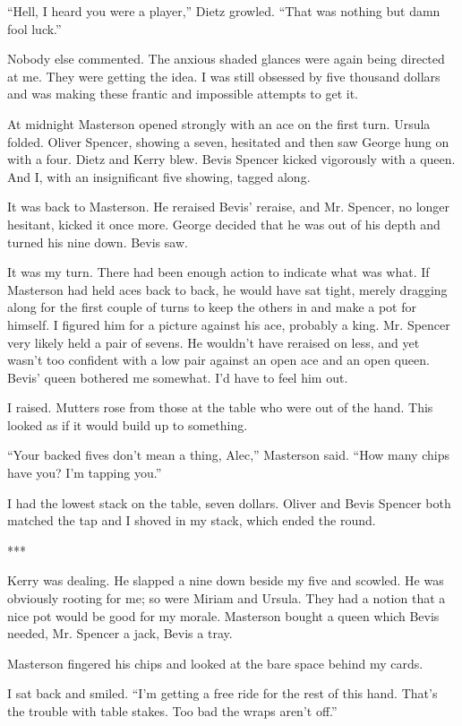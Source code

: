 \documentclass{novel}
\begin{document}
{“Hell, I heard you were a player,” Dietz growled. “That was nothing but damn fool luck.”

Nobody else commented. The anxious shaded glances were again being directed at me. They were getting the idea. I was still obsessed by five thousand dollars and was making these frantic and impossible attempts to get it.

At midnight Masterson opened strongly with an ace on the first turn. Ursula folded. Oliver Spencer, showing a seven, hesitated and then saw George hung on with a four. Dietz and Kerry blew. Bevis Spencer kicked vigorously with a queen. And I, with an insignificant five showing, tagged along.

It was back to Masterson. He reraised Bevis’ reraise, and Mr. Spencer, no longer hesitant, kicked it once more. George decided that he was out of his depth and turned his nine down. Bevis saw.

It was my turn. There had been enough action to indicate what was what. If Masterson had held aces back to back, he would have sat tight, merely dragging along for the first couple of turns to keep the others in and make a pot for himself. I figured him for a picture against his ace, probably a king. Mr. Spencer very likely held a pair of sevens. He wouldn’t have reraised on less, and yet wasn’t too confident with a low pair against an open ace and an open queen. Bevis’ queen bothered me somewhat. I’d have to feel him out.

I raised. Mutters rose from those at the table who were out of the hand. This looked as if it would build up to something.

“Your backed fives don’t mean a thing, Alec,” Masterson said. “How many chips have you? I’m tapping you.”

I had the lowest stack on the table, seven dollars. Oliver and Bevis Spencer both matched the tap and I shoved in my stack, which ended the round.

***

Kerry was dealing. He slapped a nine down beside my five and scowled. He was obviously rooting for me; so were Miriam and Ursula. They had a notion that a nice pot would be good for my morale. Masterson bought a queen which Bevis needed, Mr. Spencer a jack, Bevis a tray.

Masterson fingered his chips and looked at the bare space behind my cards.

I sat back and smiled. “I’m getting a free ride for the rest of this hand. That’s the trouble with table stakes. Too bad the wraps aren’t off.”

}
\end{document}
